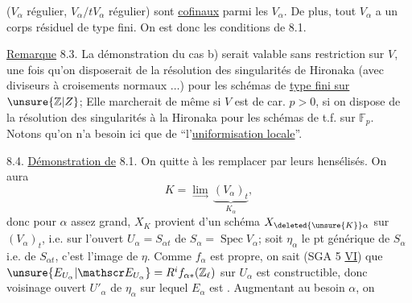 ($V_\alpha$ régulier,  $V_\alpha/tV_\alpha$ régulier) sont \uline{cofinaux} parmi les $V_\alpha$. De plus, tout $V_\alpha$ a un corps résiduel de type fini. On est donc  les conditions de 8.1.

\uline{Remarque} 8.3.  La démonstration du cas b)  serait valable sans restriction sur $V$, une fois qu'on disposerait de la résolution des singularités  de Hironaka  (avec diviseurs à croisements normaux $\ldots$) pour les schémas de \uline{type fini sur $\unsure{\mathbb Z|Z}$};  Elle marcherait de même si $V$ est de car. $p>0$, si on dispose de la résolution des singularités à la Hironaka pour les schémas de t.f. sur $\mathbb F_p$. Notons qu'on n'a besoin ici  que de ``l'\uline{uniformisation locale}''.

8.4. \uline{Démonstration de} 8.1. On   quitte à les remplacer par leurs hensélisés. On aura
\[
 K=\underset{\longrightarrow}{\lim}\,\underbrace{(V_\alpha)_t}_{K_\alpha},
\]
donc pour $\alpha$ assez grand, $X_K$ provient d'un schéma  $X_{\deleted{\unsure{K}}\alpha}$ sur  $(V_\alpha)_t$, i.e. sur l'ouvert $U_\alpha=S_{\alpha t}$ de $S_\alpha=\operatorname{Spec}V_\alpha$;  soit $\eta_\alpha$ le pt générique de $S_\alpha$ i.e. de $S_{\alpha t}$, c'est l'image de $\eta$.
Comme $f_\alpha$ est propre, on sait (SGA 5 \uline{VI}) que $\unsure{E_{U_\alpha}|\mathscr E_{U_\alpha}}=R^if_{\alpha *}(\mathbb Z_\ell)$ sur $U_\alpha$ est constructible, donc  voisinage ouvert $U'_\alpha$ de $\eta_\alpha$ sur lequel $E_\alpha$ est . Augmentant au besoin $\alpha$,  on
